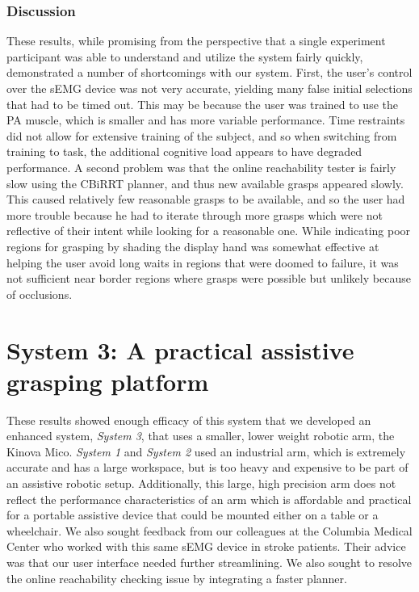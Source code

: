 \subsubsection{Discussion}
These results, while promising from the perspective that a single experiment participant was able to understand and utilize the system fairly quickly, demonstrated a number of shortcomings with our system. First, the user's control over the sEMG device was not very accurate, yielding many false initial selections that had to be timed out. This may be because the user was trained to use the PA muscle, which is smaller and has more variable performance. Time restraints did not allow for extensive training of the subject, and so when switching from training to task, the additional cognitive load appears to have degraded performance. A second problem was that the online reachability tester is fairly slow using the CBiRRT planner, and thus new available grasps appeared slowly. This caused relatively few reasonable grasps to be available, and so the user had more trouble because he had to iterate through more grasps which were not reflective of their intent while looking for a reasonable one. While indicating poor regions for grasping by shading the display hand was somewhat effective at helping the user avoid long waits in regions that were doomed to failure, it was not sufficient near border regions where grasps were possible but unlikely because of occlusions. 

\section{System 3: A practical assistive grasping platform}
\setcounter{subsection}{0}
These results showed enough efficacy of this system that we developed an enhanced system, \emph{System 3},  that uses a smaller, lower weight robotic arm, the Kinova Mico. \emph{System 1} and \emph{System 2} used an industrial arm, which is extremely accurate and has a large workspace, but is too heavy and expensive to be part of an assistive robotic setup. Additionally, this large, high precision arm does not reflect the performance characteristics of an arm which is affordable and practical for a portable assistive device that could be mounted either on a table or a wheelchair.
We also sought feedback from our colleagues at the Columbia Medical Center who worked with this same sEMG device in stroke patients. Their advice was that our user interface needed further streamlining. We also sought to resolve the online reachability checking issue by integrating a faster planner. 

